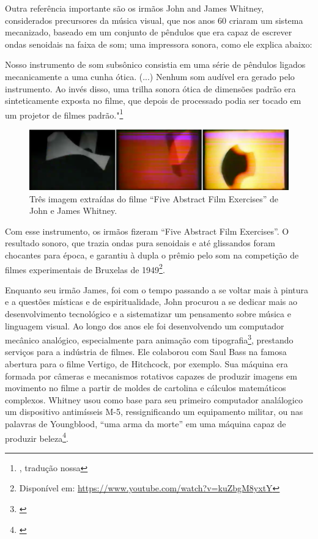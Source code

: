 Outra referência importante são os irmãos John and James Whitney, considerados precursores da música visual, que nos anos 60 criaram um sistema mecanizado, baseado em um conjunto de pêndulos que era capaz de escrever ondas senoidais na faixa de som; uma impressora sonora, como ele explica abaixo:

\begin{citacao}
Nosso instrumento de som subsônico consistia em uma série de pêndulos ligados mecanicamente a uma cunha ótica. (...) Nenhum som audível era gerado pelo instrumento. Ao invés disso, uma trilha sonora ótica de dimensões padrão era sinteticamente exposta no filme, que depois de processado podia ser tocado em um projetor de filmes padrão."\footnote{\cite[152]{Whitney1980}, tradução nossa} 
\end{citacao}

\begin{figure}
    \caption{\label{witney}Três imagem extraídas do filme ``Five Abstract Film Exercises'' de John e James Whitney.}
    
        \includegraphics[width=1\linewidth]{pictures/cap2/witney}
    
\end{figure}


Com esse instrumento, os irmãos fizeram ``Five Abstract Film Exercises''. O resultado sonoro, que trazia ondas pura senoidais e até glissandos foram chocantes para época, e garantiu à dupla o prêmio pelo som na competição de filmes experimentais de Bruxelas de 1949\footnote{Disponível em: \url{https://www.youtube.com/watch?v=kuZbgM8yxtY}}.


Enquanto seu irmão James, foi com o tempo passando a se voltar mais à pintura e a questões místicas e de espiritualidade, John procurou a se dedicar mais ao desenvolvimento tecnológico e a sistematizar um pensamento sobre música e linguagem visual. Ao longo dos anos ele foi desenvolvendo um computador mecânico analógico, especialmente para animação com tipografia\footnote{\cite{Youngblood1970}}, prestando serviços para a indústria de filmes. Ele colaborou com Saul Bass na famosa abertura para o filme Vertigo, de Hitchcock, por exemplo. Sua máquina era formada por câmeras e mecanismos rotativos capazes de produzir imagens em movimento no filme a partir de moldes de cartolina e cálculos matemáticos complexos.  Whitney usou como base para seu primeiro computador analálogico um dispositivo antimísseis M-5, ressignificando um equipamento militar, ou nas palavras de Youngblood, ``uma arma da morte'' em uma máquina capaz de produzir beleza\footnote{\cite{Youngblood1970}}.

